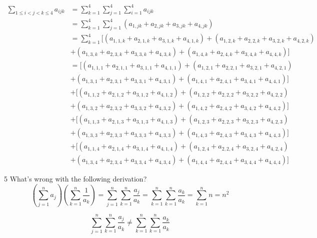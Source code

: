 \documentclass[a4paper,12pt]{article}
\makeatletter
\newtheorem*{solution}{Solution}
\theoremstyle{definition}
\renewenvironment{solution}[1][Solution] {\par\pushQED{\qed}\normalfont\topsep6\p@\@plus6\p@\relax\trivlist\item[\hskip\labelsep\bfseries#1\@addpunct{.}]\ignorespaces}{\popQED\endtrivlist\@endpefalse} \makeatother
\newenvironment{problems}{\begin{list}{}{\renewcommand{\makelabel}[1]{\textbf{##1}\hfil}}}{\end{list}}
\makeatother
\begin{document}
\begin{problems}
\begin{solution}
        \begin{align*}
            \sum_{1\leq i<j<k\leq 4}a_{ijk} &= \sum_{k=1}^4\sum_{j=1}^4\sum_{i=1}^4 a_{ijk} \\&= \sum_{k=1}^4\sum_{j=1}^4 (a_{1,jk} + a_{2,jk} + a_{3,jk} + a_{4,jk}) \\
            &= \sum_{k=1}^4 [(a_{1,1,k} + a_{2,1,k} + a_{3,1,k} + a_{4,1,k}) + (a_{1,2,k} + a_{2,2,k} + a_{3,2,k} + a_{4,2,k}) \\
            &+ (a_{1,3,k} + a_{2,3,k} + a_{3,3,k} + a_{4,3,k}) + (a_{1,4,k} + a_{2,4,k} + a_{3,4,k} + a_{4,4,k})]\\
            &= [(a_{1,1,1} + a_{2,1,1} + a_{3,1,1} + a_{4,1,1}) + (a_{1,2,1} + a_{2,2,1} + a_{3,2,1} + a_{4,2,1}) \\
            &+ (a_{1,3,1} + a_{2,3,1} + a_{3,3,1} + a_{4,3,1}) + (a_{1,4,1} + a_{2,4,1} + a_{3,4,1} + a_{4,4,1})] \\
            &+[(a_{1,1,2} + a_{2,1,2} + a_{3,1,2} + a_{4,1,2}) + (a_{1,2,2} + a_{2,2,2} + a_{3,2,2} + a_{4,2,2}) \\
            &+ (a_{1,3,2} + a_{2,3,2} + a_{3,3,2} + a_{4,3,2}) + (a_{1,4,2} + a_{2,4,2} + a_{3,4,2} + a_{4,4,2})]\\
            &+[(a_{1,1,3} + a_{2,1,3} + a_{3,1,3} + a_{4,1,3}) + (a_{1,2,3} + a_{2,2,3} + a_{3,2,3} + a_{4,2,3}) \\
            &+ (a_{1,3,3} + a_{2,3,3} + a_{3,3,3} + a_{4,3,3}) + (a_{1,4,3} + a_{2,4,3} + a_{3,4,3} + a_{4,4,3})]\\
            &+ [(a_{1,1,4} + a_{2,1,4} + a_{3,1,4} + a_{4,1,4}) + (a_{1,2,4} + a_{2,2,4} + a_{3,2,4} + a_{4,2,4}) \\
            &+ (a_{1,3,4} + a_{2,3,4} + a_{3,3,4} + a_{4,3,4}) + (a_{1,4,4} + a_{2,4,4} + a_{3,4,4} + a_{4,4,4})]
        \end{align*}
    \end{solution}
    \item[5] What's wrong with the following derivation?
    \begin{equation*}
        \left(\sum_{j=1}^n a_j\right)\left(\sum_{k=1}^n \frac{1}{a_k}\right) = \sum_{j=1}^n\sum_{k=1}^n\frac{a_j}{a_k} = \sum_{k=1}^n\sum_{k=1}^n \frac{a_k}{a_k} = \sum_{k=1}^n n = n^2
    \end{equation*}
    \begin{solution}
        \begin{equation*}
            \sum_{j=1}^n\sum_{k=1}^n\frac{a_j}{a_k} \neq \sum_{k=1}^n\sum_{k=1}^n \frac{a_k}{a_k}
        \end{equation*}

\end{solution}
\end{problems}
\end{document}
